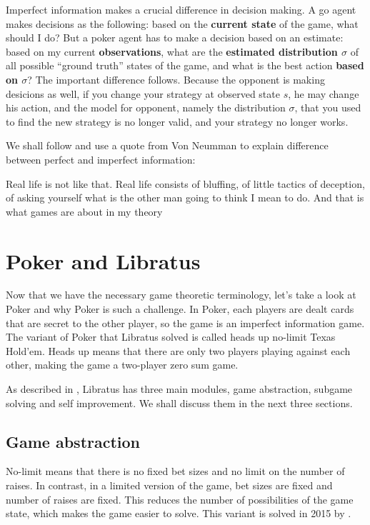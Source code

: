 \documentclass[10pt,a4paper]{article}
\begin{document}
Imperfect information makes a crucial difference in decision making. A go agent makes decisions as the following: based on the \textbf{current state} of the game, what should I do? But a poker agent has to make a decision based on an estimate: based on my current \textbf{observations}, what are the \textbf{estimated distribution $\sigma$} of all possible ``ground truth'' states of the game, and what is the best action \textbf{based on $\sigma$}? The important difference follows. Because the opponent is making desicions as well, if you change your strategy at observed state $s$, he may change his action, and the model for opponent, namely the distribution $\sigma$, that you used to find the new strategy is no longer valid, and your strategy no longer works. 

We shall follow \cite{bowling2015heads} and use a quote from Von Neumman to explain difference between perfect and imperfect information:

\begin{displayquote}
Real life is not like that. Real life consists of bluffing, of little tactics of deception, of asking yourself what is the other man going to think I mean to do. And that is what games are about in my theory
\end{displayquote}

\newpage
\section{Poker and Libratus}
Now that we have the necessary game theoretic terminology, let's take a look at Poker and why Poker is such a challenge. In Poker, each players are dealt cards that are secret to the other player, so the game is an imperfect information game. The variant of Poker that Libratus solved is called heads up no-limit Texas Hold'em. Heads up means that there are only two players playing against each other, making the game a two-player zero sum game. 

As described in \cite{brown2017superhuman}, Libratus has three main modules, game abstraction, subgame solving and self improvement. We shall discuss them in the next three sections.

\subsection{Game abstraction}
No-limit means that there is no fixed bet sizes and no limit on the number of raises. In contrast, in a limited version of the game, bet sizes are fixed and number of raises are fixed. This reduces the number of possibilities of the game state, which makes the game easier to solve. This variant is solved in 2015 by \cite{bowling2015heads}. 
\end{document}
